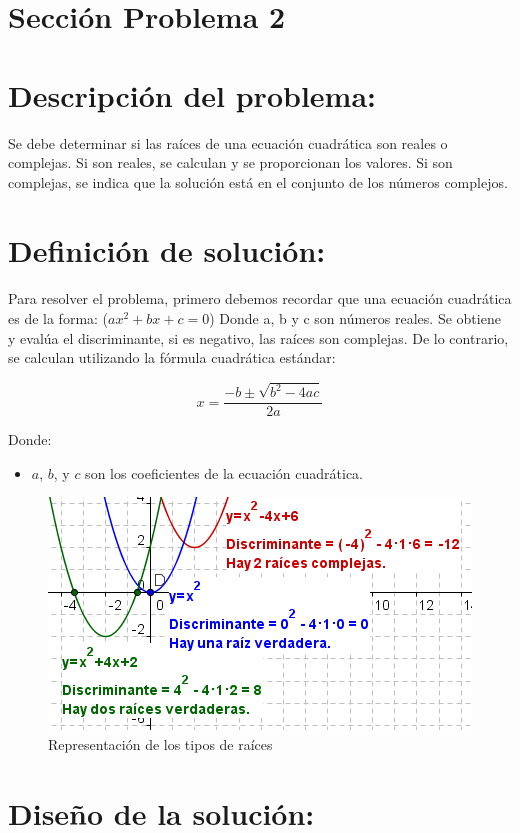 \documentclass{IEEEcsmag}
\begin{document}
\section{Sección Problema 2} 
\section*{Descripción del problema:}
Se debe determinar si las raíces de una ecuación cuadrática son reales o complejas. Si son reales, se calculan y se proporcionan los valores. Si son complejas, se indica que la solución está en el conjunto de los números complejos.


\section*{Definición de solución:}
Para resolver el problema, primero debemos recordar que una ecuación cuadrática es de la forma:   (\(ax^2 + bx + c = 0\)) Donde a, b y c son números reales. Se obtiene y evalúa el discriminante, si es negativo, las raíces son complejas. De lo contrario, se calculan utilizando la fórmula cuadrática estándar:

\[ x = \frac{-b \pm \sqrt{b^2 - 4ac}}{2a} \]

Donde:
\begin{itemize}
    \item \(a\), \(b\), y \(c\) son los coeficientes de la ecuación cuadrática.
    
\end{itemize}
\begin{figure}[h!]
    \centering
    \includegraphics[width=0.6\linewidth]{./latex-imagenes/discriminant.png}
    \caption{Representación de los tipos de raíces}
    \label{fig: Grafica Ecuacion Recta}
\end{figure}
\section*{Diseño de la solución:}
\end{document}
